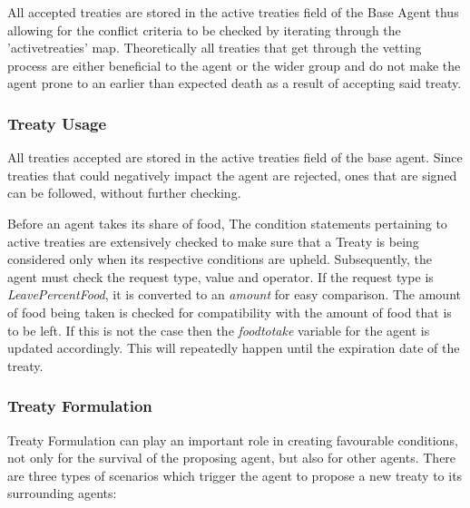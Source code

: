 All accepted treaties are stored in the active treaties field of the Base Agent thus allowing for the conflict criteria to be checked by iterating through the 'activetreaties' map. Theoretically all treaties that get through the vetting process are either beneficial to the agent or the wider group and do not make the agent prone to an earlier than expected death as a result of accepting said treaty.

\subsubsection{Treaty Usage}
\label{subsec: Treaty Usage}
All treaties accepted are stored in the active treaties field of the base agent. Since treaties that could negatively impact the agent are rejected, ones that are signed can be followed, without further checking. 

Before an agent takes its share of food, The condition statements pertaining to active treaties are extensively checked to make sure that a Treaty is being considered only when its respective conditions are upheld. Subsequently, the agent must check the request type, value and operator. If the request type is \textit{LeavePercentFood}, it is converted to an \textit{amount} for easy comparison. 
The amount of food being taken is checked for compatibility with the amount of food that is to be left. If this is not the case then the \textit{foodtotake} variable for the agent is updated accordingly.
This will repeatedly happen until the expiration date of the treaty.

\subsubsection{Treaty Formulation}
\label{subsec: Treaty Formulation}
Treaty Formulation can play an important role in creating favourable conditions, not only for the survival of the proposing agent, but also for other agents. There are three types of scenarios which trigger the agent to propose a new treaty to its surrounding agents:

